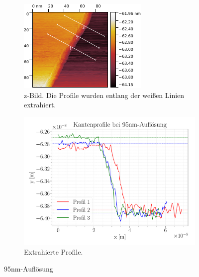 \begin{figure}[H]
	\centering
	\begin{subfigure}{0.49\textwidth}
		\centering
\includegraphics[width=\textwidth]{../Gwyddion/HOPG/95nm.pdf}
\caption{z-Bild. Die Profile wurden entlang der weißen Linien extrahiert.}
\label{95nm}
	\end{subfigure}
	\begin{subfigure}{0.5\textwidth}
		\centering
\includegraphics[width=\textwidth]{../Figures/95nm_profiles.pdf}
\caption{Extrahierte Profile.}
\label{95nmProfiles}
	\end{subfigure}
	
	\caption{{95}{nm}-Auflösung}
\end{figure}


